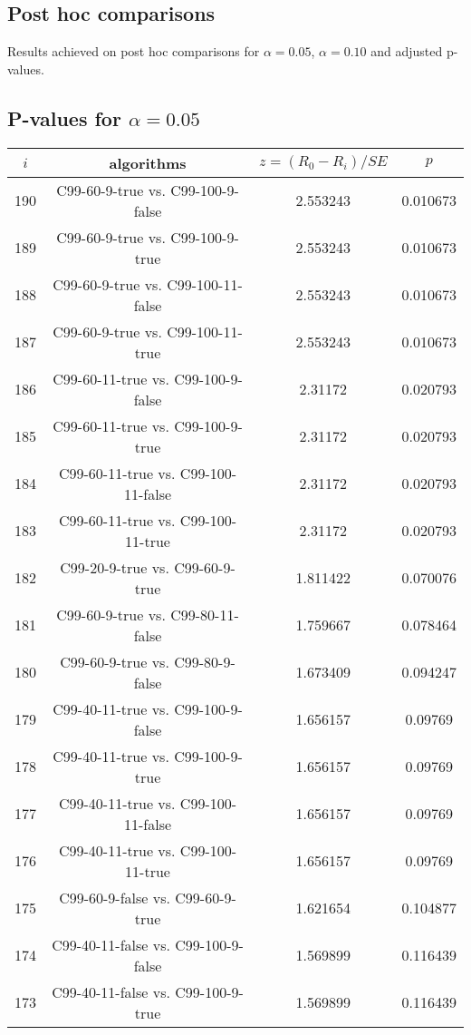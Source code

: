 \documentclass[a4paper,10pt]{article}
\begin{document}
\begin{landscape}
\pagebreak

\section{Post hoc comparisons}

Results achieved on post hoc comparisons for $\alpha = 0.05$, $\alpha = 0.10$ and adjusted p-values.

\subsection{P-values for $\alpha=0.05$}

\begin{table}[!htp]
\centering\scriptsize
\begin{tabular}{cccc}
$i$&algorithms&$z=(R_0 - R_i)/SE$&$p$\\
\hline190&C99-60-9-true vs. C99-100-9-false&2.553243&0.010673\\
189&C99-60-9-true vs. C99-100-9-true&2.553243&0.010673\\
188&C99-60-9-true vs. C99-100-11-false&2.553243&0.010673\\
187&C99-60-9-true vs. C99-100-11-true&2.553243&0.010673\\
186&C99-60-11-true vs. C99-100-9-false&2.31172&0.020793\\
185&C99-60-11-true vs. C99-100-9-true&2.31172&0.020793\\
184&C99-60-11-true vs. C99-100-11-false&2.31172&0.020793\\
183&C99-60-11-true vs. C99-100-11-true&2.31172&0.020793\\
182&C99-20-9-true vs. C99-60-9-true&1.811422&0.070076\\
181&C99-60-9-true vs. C99-80-11-false&1.759667&0.078464\\
180&C99-60-9-true vs. C99-80-9-false&1.673409&0.094247\\
179&C99-40-11-true vs. C99-100-9-false&1.656157&0.09769\\
178&C99-40-11-true vs. C99-100-9-true&1.656157&0.09769\\
177&C99-40-11-true vs. C99-100-11-false&1.656157&0.09769\\
176&C99-40-11-true vs. C99-100-11-true&1.656157&0.09769\\
175&C99-60-9-false vs. C99-60-9-true&1.621654&0.104877\\
174&C99-40-11-false vs. C99-100-9-false&1.569899&0.116439\\
173&C99-40-11-false vs. C99-100-9-true&1.569899&0.116439\\

\end{tabular}
\end{table}
\end{landscape}
\end{document}
